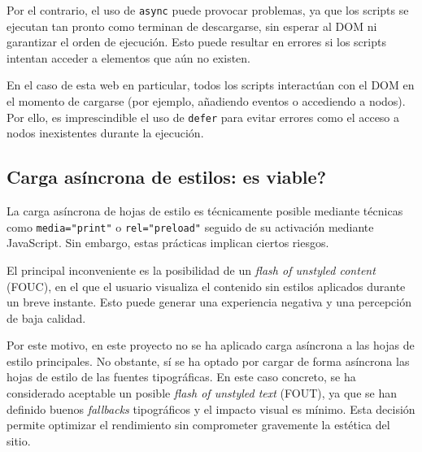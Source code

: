 \documentclass{article}
\begin{document}
Por el contrario, el uso de \texttt{async} puede provocar problemas, ya que los scripts se ejecutan tan pronto como terminan de descargarse, sin esperar al DOM ni garantizar el orden de ejecución. Esto puede resultar en errores si los scripts intentan acceder a elementos que aún no existen.

En el caso de esta web en particular, todos los scripts interactúan con el DOM en el momento de cargarse (por ejemplo, añadiendo eventos o accediendo a nodos). Por ello, es imprescindible el uso de \texttt{defer} para evitar errores como el acceso a nodos inexistentes durante la ejecución.

\subsection{Carga asíncrona de estilos: \textquestiondown es viable?}\label{subsec:carga-asincrona-de-estilos}

La carga asíncrona de hojas de estilo es técnicamente posible mediante técnicas como \texttt{media="print"} o \texttt{rel="preload"} seguido de su activación mediante JavaScript. Sin embargo, estas prácticas implican ciertos riesgos.

El principal inconveniente es la posibilidad de un \textit{flash of unstyled content} (FOUC), en el que el usuario visualiza el contenido sin estilos aplicados durante un breve instante. Esto puede generar una experiencia negativa y una percepción de baja calidad.

Por este motivo, en este proyecto no se ha aplicado carga asíncrona a las hojas de estilo principales. No obstante, sí se ha optado por cargar de forma asíncrona las hojas de estilo de las fuentes tipográficas. En este caso concreto, se ha considerado aceptable un posible \textit{flash of unstyled text} (FOUT), ya que se han definido buenos \textit{fallbacks} tipográficos y el impacto visual es mínimo. Esta decisión permite optimizar el rendimiento sin comprometer gravemente la estética del sitio.
\end{document}
